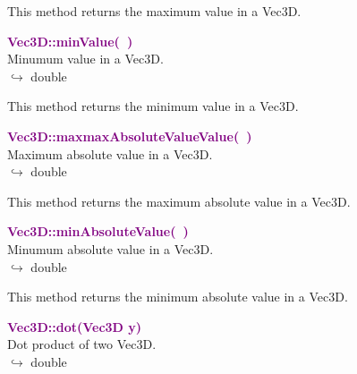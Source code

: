 This method returns the maximum value in a Vec3D.

\textcolor{purple}{\textbf{Vec3D::minValue(~)}}\label{Vec3D::minValue()}\\
Minumum value in a Vec3D.\\ \hspace*{10mm}$\hookrightarrow$ double

This method returns the minimum value in a Vec3D.

\textcolor{purple}{\textbf{Vec3D::maxmaxAbsoluteValueValue(~)}}\label{Vec3D::maxmaxAbsoluteValueValue()}\\
Maximum absolute value in a Vec3D.\\ \hspace*{10mm}$\hookrightarrow$ double

This method returns the maximum absolute value in a Vec3D.

\textcolor{purple}{\textbf{Vec3D::minAbsoluteValue(~)}}\label{Vec3D::minAbsoluteValue()}\\
Minumum absolute value in a Vec3D.\\ \hspace*{10mm}$\hookrightarrow$ double

This method returns the minimum absolute value in a Vec3D.

\textcolor{purple}{\textbf{Vec3D::dot(Vec3D y)}}\label{Vec3D::dot(Vec3D y)}\\
Dot product of two Vec3D.\\ \hspace*{10mm}$\hookrightarrow$ double

